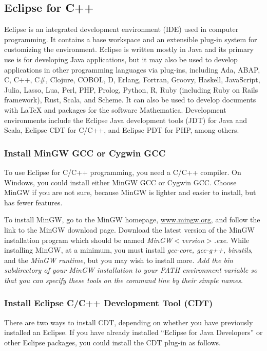 \documentclass{book}
\begin{document}
\subsection{Eclipse for C++}

Eclipse is an integrated development environment (IDE) used in computer programming. It contains a base workspace and an extensible plug-in system for customizing the environment. Eclipse is written mostly in Java and its primary use is for developing Java applications, but it may also be used to develop applications in other programming languages via plug-ins, including Ada, ABAP, C, C++, C\#, Clojure, COBOL, D, Erlang, Fortran, Groovy, Haskell, JavaScript, Julia, Lasso, Lua, Perl, PHP, Prolog, Python, R, Ruby (including Ruby on Rails framework), Rust, Scala, and Scheme. It can also be used to develop documents with LaTeX and packages for the software Mathematica. Development environments include the Eclipse Java development tools (JDT) for Java and Scala, Eclipse CDT for C/C++, and Eclipse PDT for PHP, among others.

\subsubsection{Install MinGW GCC or Cygwin GCC}

To use Eclipse for C/C++ programming, you need a C/C++ compiler. On Windows, you could install either MinGW GCC or Cygwin GCC. Choose MinGW if you are not sure, because MinGW is lighter and easier to install, but has fewer features.

To install MinGW, go to the MinGW homepage, \url{www.mingw.org}, and follow the link to the MinGW download page. Download the latest version of the MinGW installation program which should be named \textit{MinGW$<$version$>$.exe}. While installing MinGW, at a minimum, you must install \textit{gcc-core, gcc-g++, binutils}, and the \textit{MinGW runtime}, but you may wish to install more. \textit{Add the bin subdirectory of your MinGW installation to your PATH environment variable so that you can specify these tools on the command line by their simple names}.

\subsubsection{Install Eclipse C/C++ Development Tool (CDT)}

There are two ways to install CDT, depending on whether you have previously installed an Eclipse. If you have already installed \enquote{Eclipse for Java Developers} or other Eclipse packages, you could install the CDT plug-in as follows. 
\end{document}
